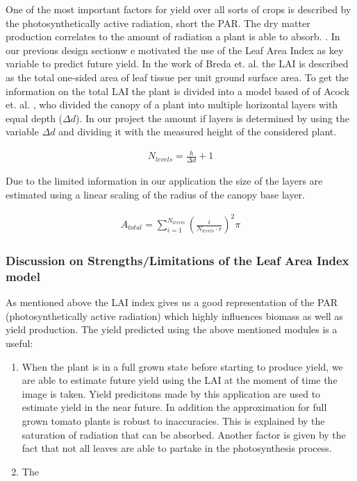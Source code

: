 One of the most important factors for yield over all sorts of crops is described by the photosynthetically active radiation,
short the PAR. The dry matter production correlates to the amount of radiation a plant is able to absorb. \cite{heuvelink1996tomato}.
In our previous design sectionw e motivated the use of the Leaf Area Index as key variable to predict future yield.
In the work of Breda et. al. the LAI is described as the total one‐sided area of leaf tissue per unit ground surface area.\cite{beda:nathalie}
To get the information on the total LAI the plant is divided into a model based of of Acock et. al. , who divided the canopy of a plant
into multiple horizontal layers with equal depth ($\Delta d$). \cite{acock1978contribution} In our project the amount if layers is determined
by using the variable $\Delta d$ and dividing it with the measured height of the considered plant.

\begin{align*}
    N_{levels} = \frac{h}{\Delta d}+1
\end{align*}

\noindent
Due to the limited information in our application the size of the layers are estimated using a linear scaling of the radius of the canopy base layer.

\begin{align*}
    A_{total} = \sum_{i=1}^{N_{levels}} (\frac{i}{N_{levels} \cdot r})^2 \pi
\end{align*}

\subsubsection{Discussion on Strengths/Limitations of the Leaf Area Index model}

As mentioned above the LAI index gives us a good representation of the PAR (photosynthetically active radiation) which highly influences biomass as well as yield production.
\cite{hossain2017leaf} The yield predicted using the above mentioned modules is a useful:

\begin{enumerate}
         \item When the plant is in a full grown state before starting to produce yield, we are able to estimate future yield using the LAI at the moment of time the image is taken. Yield predicitons made by this application are used to estimate yield in the near future. In addition the approximation for full grown tomato plants is robust to inaccuracies. This is explained by the saturation of radiation that can be absorbed. Another factor is given by the fact that not all leaves are able to partake in the photosynthesis process.

         \item The
\end{enumerate}

